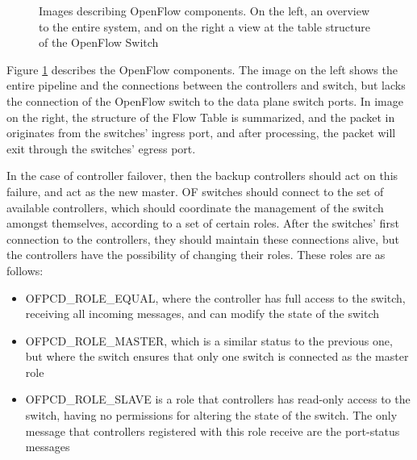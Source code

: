 \begin {enumerate}
\begin{figure} [h]
    \centering
    \begin{subfigure}
    \texttt{[image: sdn/open\_flow\_switch\_pipeline]}
    \end{subfigure}
    \begin{subfigure}
    \texttt{[image: sdn/open\_flow\_tables]}
    \end{subfigure}
    \caption{Images describing OpenFlow components. On the left, an overview to the entire system, and on the right a view at the table structure of the 
    OpenFlow Switch \cite{open_networking_foundation_openflow_2015}}
    \label{fig:of_switch}
\end{figure}

\par Figure \ref{fig:of_switch} describes the OpenFlow components. The image on the left shows the entire pipeline and the connections between the controllers and
switch, but lacks the connection of the OpenFlow switch to the data plane switch ports. In image on the right, the structure of the Flow Table is summarized, 
and the packet in originates from the switches' ingress port, and after processing, the packet will exit through the switches' egress port.

\par In the case of controller failover, then the backup controllers should act on this failure, and act as the new master. OF switches should connect to the set of
available controllers, which should coordinate the management of the switch amongst themselves, according to a set of certain roles. After the switches' first
connection to the controllers, they should maintain these connections alive, but the controllers have the possibility of changing their roles. These roles are as
follows:

\begin {itemize}
    \item \textsc {OFPCD\_ROLE\_EQUAL}, where the controller has full access to the switch, receiving all incoming messages, and can modify the state of the switch
    \item \textsc {OFPCD\_ROLE\_MASTER}, which is a similar status to the previous one, but where the switch ensures that only one switch is connected as the master
        role
    \item \textsc {OFPCD\_ROLE\_SLAVE} is a role that controllers has read-only access to the switch, having no permissions for altering the state of the switch.
        The only message that controllers registered with this role receive are the port-status messages
\end {itemize}


\end{enumerate}
